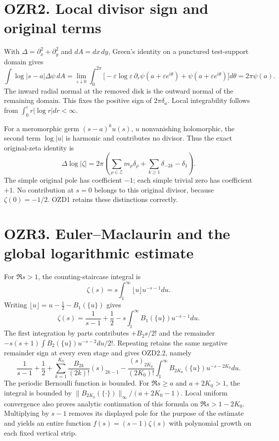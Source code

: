 \section{OZR2. Local divisor sign and original
terms}\label{ozr2.-local-divisor-sign-and-original-terms}

With \(\Delta=\partial_x^2+\partial_y^2\) and \(dA=dx\,dy\), Green's
identity on a punctured test-support domain gives \[
\int \log|s-a|\Delta\psi\,dA
=\lim_{\varepsilon\downarrow0}\int_0^{2\pi}
\bigl[-\varepsilon\log\varepsilon\,\partial_r\psi(a+\varepsilon e^{i\theta})
+\psi(a+\varepsilon e^{i\theta})\bigr]d\theta
=2\pi\psi(a).
\tag{OZR2.1}
\] The inward radial normal at the removed disk is the outward normal of
the remaining domain. This fixes the positive sign of \(2\pi\delta_a\).
Local integrability follows from
\(\int_0^\varepsilon r|\log r|dr<\infty\).

For a meromorphic germ \((s-a)^ku(s)\), \(u\) nonvanishing holomorphic,
the second term \(\log|u|\) is harmonic and contributes no divisor. Thus
the exact original-zeta identity is \[
\Delta\log|\zeta|
=2\pi\left(\sum_{\rho\in\mathscr Z}m_\rho\delta_\rho
+\sum_{k\ge1}\delta_{-2k}-\delta_1\right).
\tag{OZR2.2}
\] The simple original pole has coefficient \(-1\); each simple trivial
zero has coefficient \(+1\). No contribution at \(s=0\) belongs to this
original divisor, because \(\zeta(0)=-1/2\). OZD1 retains these
distinctions correctly.

\section{OZR3. Euler--Maclaurin and the global logarithmic
estimate}\label{ozr3.-eulermaclaurin-and-the-global-logarithmic-estimate}

For \(\Re s>1\), the counting-staircase integral is \[
\zeta(s)=s\int_1^\infty\lfloor u\rfloor u^{-s-1}du.
\] Writing \(\lfloor u\rfloor=u-\tfrac12-B_1(\{u\})\) gives \[
\zeta(s)=\frac1{s-1}+\frac12-s\int_1^\infty B_1(\{u\})u^{-s-1}du.
\] The first integration by parts contributes \(+B_2s/2!\) and the
remainder \(-s(s+1)\int B_2(\{u\})u^{-s-2}du/2!\). Repeating retains the
same negative remainder sign at every even stage and gives OZD2.2,
namely \[
\frac1{s-1}+\frac12+
\sum_{k=1}^{K_0}\frac{B_{2k}}{(2k)!}(s)_{2k-1}
-\frac{(s)_{2K_0}}{(2K_0)!}\int_1^\infty B_{2K_0}(\{u\})u^{-s-2K_0}du.
\tag{OZR3.1}
\] The periodic Bernoulli function is bounded. For \(\Re s\ge a\) and
\(a+2K_0>1\), the integral is bounded by
\(\|B_{2K_0}(\{\cdot\})\|_\infty/(a+2K_0-1)\). Local uniform convergence
also proves analytic continuation of this formula on \(\Re s>1-2K_0\).
Multiplying by \(s-1\) removes its displayed pole for the purpose of the
estimate and yields an entire function \(f(s)=(s-1)\zeta(s)\) with
polynomial growth on each fixed vertical strip.


